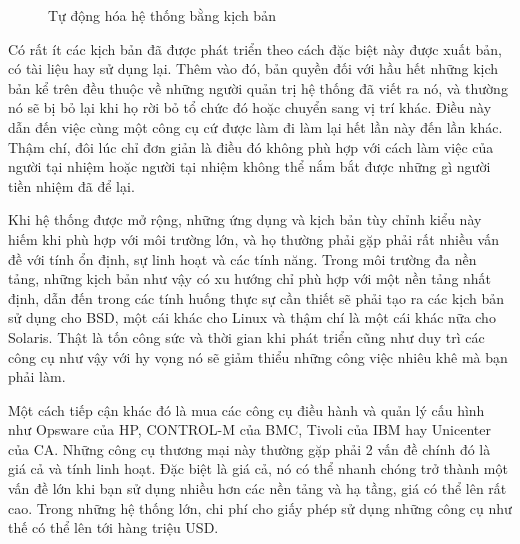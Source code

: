 \begin{figure}[h!]
    \begin{center}
    \end{center}
    \caption{Tự động hóa hệ thống bằng kịch bản}
    \label{fig:geeks_and_repetitive_tasks}
\end{figure}

Có rất ít các kịch bản đã được phát triển theo cách đặc biệt này được xuất bản, có tài liệu hay sử dụng lại. Thêm vào đó, bản quyền đối với hầu hết những kịch bản kể trên đều thuộc về những người quản trị hệ thống đã viết ra nó, và thường nó sẽ bị bỏ lại khi họ rời bỏ tổ chức đó hoặc chuyển sang vị trí khác. Điều này dẫn đến việc cùng một công cụ cứ được làm đi làm lại hết lần này đến lần khác. Thậm chí, đôi lúc chỉ đơn giản là điều đó không phù hợp với cách làm việc của người tại nhiệm hoặc người tại nhiệm không thể nắm bắt được những gì người tiền nhiệm đã để lại.

Khi hệ thống được mở rộng, những ứng dụng và kịch bản tùy chỉnh kiểu này hiếm khi phù hợp với môi trường lớn, và họ thường phải gặp phải rất nhiều vấn đề với tính ổn định, sự linh hoạt và các tính năng. Trong môi trường đa nền tảng, những kịch bản như vậy có xu hướng chỉ phù hợp với một nền tảng nhất định, dẫn đến trong các tính huống thực sự cần thiết sẽ phải tạo ra các kịch bản sử dụng cho BSD, một cái khác cho Linux và thậm chí là một cái khác nữa cho Solaris. Thật là tốn công sức và thời gian khi phát triển cũng như duy trì các công cụ như vậy với hy vọng nó sẽ giảm thiểu những công việc nhiêu khê mà bạn phải làm.

Một cách tiếp cận khác đó là mua các công cụ điều hành và quản lý cấu hình như Opsware của HP, CONTROL-M của BMC, Tivoli của IBM hay Unicenter của CA. Những công cụ thương mại này thường gặp phải 2 vấn đề chính đó là giá cả và tính linh hoạt. Đặc biệt là giá cả, nó có thể nhanh chóng trở thành một vấn đề lớn khi bạn sử dụng nhiều hơn các nền tảng và hạ tầng, giá có thể lên rất cao. Trong những hệ thống lớn, chi phí cho giấy phép sử dụng những công cụ như thế có thể lên tới hàng triệu USD.

